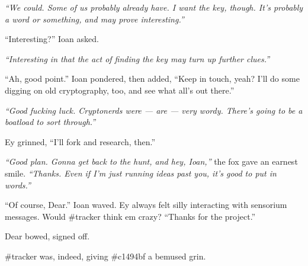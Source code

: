 \emph{``We could. Some of us probably already have. I want the key, though. It's probably a word or something, and may prove interesting.''}

``Interesting?'' Ioan asked.

\emph{``Interesting in that the act of finding the key may turn up further clues.''}

``Ah, good point.'' Ioan pondered, then added, ``Keep in touch, yeah? I'll do some digging on old cryptography, too, and see what all's out there.''

\emph{``Good fucking luck. Cryptonerds were --- are --- very wordy. There's going to be a boatload to sort through.''}

Ey grinned, ``I'll fork and research, then.''

\emph{``Good plan. Gonna get back to the hunt, and hey, Ioan,''} the fox gave an earnest smile. \emph{``Thanks. Even if I'm just running ideas past you, it's good to put in words.''}

``Of course, Dear.'' Ioan waved. Ey always felt silly interacting with sensorium messages. Would \#tracker think em crazy? ``Thanks for the project.''

Dear bowed, signed off.

\#tracker was, indeed, giving \#c1494bf a bemused grin.

